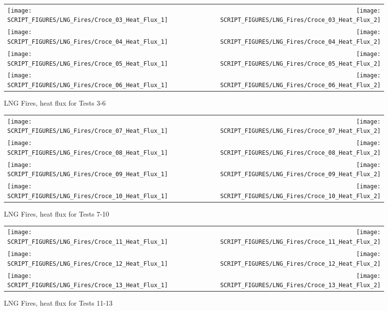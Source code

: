 \newpage

\begin{figure}[p]
\begin{tabular*}{\textwidth}{l@{\extracolsep{\fill}}r}
\texttt{[image: SCRIPT\_FIGURES/LNG\_Fires/Croce\_03\_Heat\_Flux\_1]} &
\texttt{[image: SCRIPT\_FIGURES/LNG\_Fires/Croce\_03\_Heat\_Flux\_2]} \\
\texttt{[image: SCRIPT\_FIGURES/LNG\_Fires/Croce\_04\_Heat\_Flux\_1]} &
\texttt{[image: SCRIPT\_FIGURES/LNG\_Fires/Croce\_04\_Heat\_Flux\_2]} \\
\texttt{[image: SCRIPT\_FIGURES/LNG\_Fires/Croce\_05\_Heat\_Flux\_1]} &
\texttt{[image: SCRIPT\_FIGURES/LNG\_Fires/Croce\_05\_Heat\_Flux\_2]} \\
\texttt{[image: SCRIPT\_FIGURES/LNG\_Fires/Croce\_06\_Heat\_Flux\_1]} &
\texttt{[image: SCRIPT\_FIGURES/LNG\_Fires/Croce\_06\_Heat\_Flux\_2]}
\end{tabular*}
\caption[LNG Fires, heat flux for Tests 3-6]
{LNG Fires, heat flux for Tests 3-6}
\label{Croce_Heat_Flux_2}
\end{figure}

\begin{figure}[p]
\begin{tabular*}{\textwidth}{l@{\extracolsep{\fill}}r}
\texttt{[image: SCRIPT\_FIGURES/LNG\_Fires/Croce\_07\_Heat\_Flux\_1]} &
\texttt{[image: SCRIPT\_FIGURES/LNG\_Fires/Croce\_07\_Heat\_Flux\_2]} \\
\texttt{[image: SCRIPT\_FIGURES/LNG\_Fires/Croce\_08\_Heat\_Flux\_1]} &
\texttt{[image: SCRIPT\_FIGURES/LNG\_Fires/Croce\_08\_Heat\_Flux\_2]} \\
\texttt{[image: SCRIPT\_FIGURES/LNG\_Fires/Croce\_09\_Heat\_Flux\_1]} &
\texttt{[image: SCRIPT\_FIGURES/LNG\_Fires/Croce\_09\_Heat\_Flux\_2]} \\
\texttt{[image: SCRIPT\_FIGURES/LNG\_Fires/Croce\_10\_Heat\_Flux\_1]} &
\texttt{[image: SCRIPT\_FIGURES/LNG\_Fires/Croce\_10\_Heat\_Flux\_2]}
\end{tabular*}
\caption[LNG Fires, heat flux for Tests 7-10]
{LNG Fires, heat flux for Tests 7-10}
\label{Croce_Heat_Flux_3}
\end{figure}

\begin{figure}[p]
\begin{tabular*}{\textwidth}{l@{\extracolsep{\fill}}r}
\texttt{[image: SCRIPT\_FIGURES/LNG\_Fires/Croce\_11\_Heat\_Flux\_1]} &
\texttt{[image: SCRIPT\_FIGURES/LNG\_Fires/Croce\_11\_Heat\_Flux\_2]} \\
\texttt{[image: SCRIPT\_FIGURES/LNG\_Fires/Croce\_12\_Heat\_Flux\_1]} &
\texttt{[image: SCRIPT\_FIGURES/LNG\_Fires/Croce\_12\_Heat\_Flux\_2]} \\
\texttt{[image: SCRIPT\_FIGURES/LNG\_Fires/Croce\_13\_Heat\_Flux\_1]} &
\texttt{[image: SCRIPT\_FIGURES/LNG\_Fires/Croce\_13\_Heat\_Flux\_2]}
\end{tabular*}
\caption[LNG Fires, heat flux for Tests 11-13]
{LNG Fires, heat flux for Tests 11-13}
\label{Croce_Heat_Flux_4}
\end{figure}


